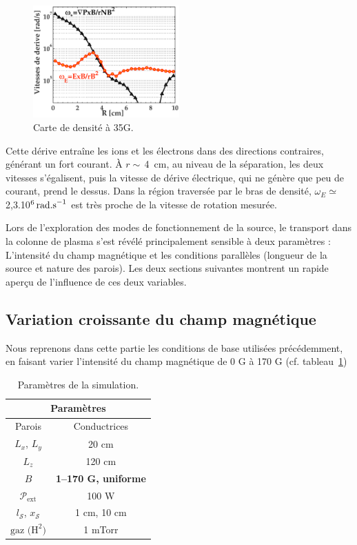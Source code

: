 \begin{refsection}
\begin{figure}[!htbp]
\centering
\includegraphics[width=0.5\textwidth]{figures/4-CybeleProfileVitessesDerive.eps}
{\caption{Carte de densité à 35G.}
\label{4-CybeleVitessesDerive}}
\end{figure}

Cette dérive entraîne les ions et les électrons dans des directions
contraires, générant un fort courant. À $r\sim\,$4~cm, au niveau de la
séparation, les deux vitesses s'égalisent, puis la vitesse de dérive électrique, qui ne
génère que peu de courant, prend le dessus. Dans la région traversée par le bras
de densité, $\omega_E\simeq$ 2,3.10$^{{6}}\,\text{rad.s}^{{-1}}$
est très proche de la vitesse de rotation mesurée.

Lors de l'exploration des modes de fonctionnement de la source, le transport
dans la colonne de plasma s'est révélé principalement sensible à deux
paramètres : L'intensité du champ magnétique et les conditions parallèles 
(longueur de la source et nature des parois). Les deux sections suivantes
montrent un rapide aperçu de l'influence de ces deux variables.

\subsection{Variation croissante du champ magnétique}
Nous reprenons dans cette partie les conditions de base utilisées précédemment,
en faisant varier l'intensité du champ magnétique de 0 G à 170 G (cf.
tableau~\ref{4-CybeleParam2})

\begin{table}[!htbp]
\footnotesize\centering
{}
\begin{tabular}{cc}\toprule
\multicolumn{2}{c}{\bf Paramètres}\\
\midrule 
Parois & Conductrices\\
$L_x$, $L_y$ & 20 cm\\
$L_z$ & 120 cm\\
$B$&\textbf{1--170 G, uniforme}\\
$\mathcal{P}_\text{ext}$&100 W\\
$l_\mathcal{S}$, $x_\mathcal{S}$& 1 cm, 10 cm\\
$\text{gaz (H}^2\text{)}$ & 1 mTorr\\
\bottomrule
\end{tabular}
\caption{Paramètres de la simulation.}\label{4-CybeleParam2}
\end{table}


\end{refsection}
